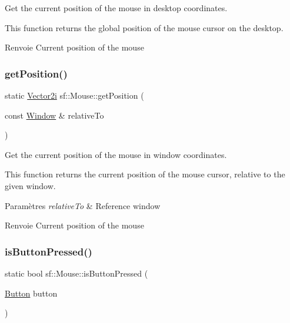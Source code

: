 Get the current position of the mouse in desktop coordinates. 

This function returns the global position of the mouse cursor on the desktop.

\begin{DoxyReturn}{Renvoie}
Current position of the mouse 
\end{DoxyReturn}
\mbox{\label{classsf_1_1Mouse_a93b4d2ebef728e77a0ec9d83c1e0b0c8}} 
\subsubsection{\texorpdfstring{get\+Position()}{getPosition()}\hspace{0.1cm}{\footnotesize\ttfamily [2/2]}}
{\footnotesize\ttfamily static \hyperlink{classsf_1_1Vector2}{Vector2i} sf\+::\+Mouse\+::get\+Position (\begin{DoxyParamCaption}\item[{const \hyperlink{classsf_1_1Window}{Window} \&}]{relative\+To }\end{DoxyParamCaption})\hspace{0.3cm}{\ttfamily [static]}}



Get the current position of the mouse in window coordinates. 

This function returns the current position of the mouse cursor, relative to the given window.


\begin{DoxyParams}{Paramètres}
{\em relative\+To} & Reference window\\
\hline
\end{DoxyParams}
\begin{DoxyReturn}{Renvoie}
Current position of the mouse 
\end{DoxyReturn}
\mbox{\label{classsf_1_1Mouse_ab647159eb88e369a0332a9c5a7ba6687}} 
\subsubsection{\texorpdfstring{is\+Button\+Pressed()}{isButtonPressed()}}
{\footnotesize\ttfamily static bool sf\+::\+Mouse\+::is\+Button\+Pressed (\begin{DoxyParamCaption}\item[{\hyperlink{classsf_1_1Mouse_a4fb128be433f9aafe66bc0c605daaa90}{Button}}]{button }\end{DoxyParamCaption})\hspace{0.3cm}{\ttfamily [static]}}



